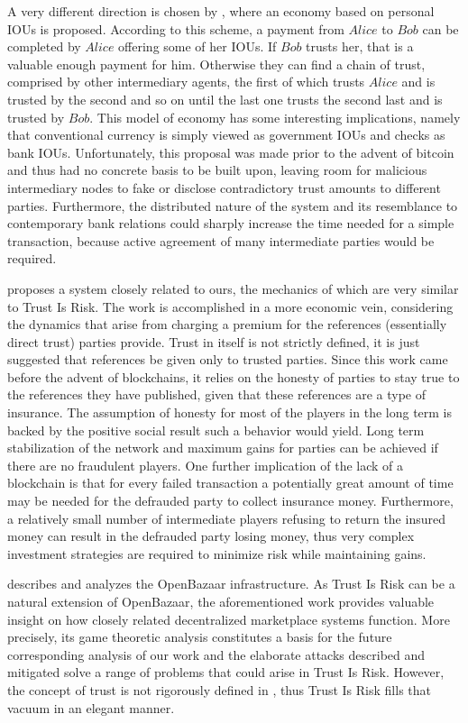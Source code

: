   A very different direction is chosen by \cite{iou}, where an economy based on personal IOUs is proposed. According to this
  scheme, a payment from $Alice$ to $Bob$ can be completed by $Alice$ offering some of her IOUs. If $Bob$ trusts her, that is
  a valuable enough payment for him. Otherwise they can find a chain of trust, comprised by other intermediary agents, the
  first of which trusts $Alice$ and is trusted by the second and so on until the last one trusts the second last and is
  trusted by $Bob$. This model of economy has some interesting implications, namely that conventional currency is simply
  viewed as government IOUs and checks as bank IOUs. Unfortunately, this proposal was made prior to the advent of bitcoin
  and thus had no concrete basis to be built upon, leaving room for malicious intermediary nodes to fake or disclose
  contradictory trust amounts to different parties. Furthermore, the distributed nature of the system and its resemblance to
  contemporary bank relations could sharply increase the time needed for a simple transaction, because active agreement of
  many intermediate parties would be required.

  \cite{davis} proposes a system closely related to ours, the mechanics of which are very similar to Trust Is Risk. The
  work is accomplished in a more economic vein, considering the dynamics that arise from charging a premium for the
  references (essentially direct trust) parties provide. Trust in itself is not strictly defined, it is just suggested that
  references be given only to trusted parties. Since this work came before the advent of blockchains, it relies on the
  honesty of parties to stay true to the references they have published, given that these references are a type of insurance.
  The assumption of honesty for most of the players in the long term is backed by the positive social result such a behavior
  would yield. Long term stabilization of the network and maximum gains for parties can be achieved if there are no
  fraudulent players. One further implication of the lack of a blockchain is that for every failed transaction a potentially
  great amount of time may be needed for the defrauded party to collect insurance money. Furthermore, a relatively small
  number of intermediate players refusing to return the insured money can result in the defrauded party losing money, thus
  very complex investment strategies are required to minimize risk while maintaining gains.

  \cite{dionyziz} describes and analyzes the OpenBazaar infrastructure. As Trust Is Risk can be a natural extension of
  OpenBazaar, the aforementioned work provides valuable insight on how closely related decentralized marketplace systems
  function. More precisely, its game theoretic analysis constitutes a basis for the future corresponding analysis of our
  work and the elaborate attacks described and mitigated solve a range of problems that could arise in Trust Is Risk.
  However, the concept of trust is not rigorously defined in \cite{dionyziz}, thus Trust Is Risk fills that vacuum in an
  elegant manner.

